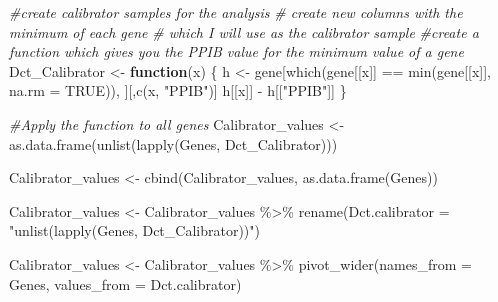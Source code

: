 \documentclass[
]{article}
\newenvironment{Shaded}{\begin{snugshade}}{\end{snugshade}}
\newcommand{\AttributeTok}[1]{\textcolor[rgb]{0.77,0.63,0.00}{#1}}
\newcommand{\CommentTok}[1]{\textcolor[rgb]{0.56,0.35,0.01}{\textit{#1}}}
\newcommand{\ConstantTok}[1]{\textcolor[rgb]{0.00,0.00,0.00}{#1}}
\newcommand{\ControlFlowTok}[1]{\textcolor[rgb]{0.13,0.29,0.53}{\textbf{#1}}}
\newcommand{\FunctionTok}[1]{\textcolor[rgb]{0.00,0.00,0.00}{#1}}
\newcommand{\NormalTok}[1]{#1}
\newcommand{\OtherTok}[1]{\textcolor[rgb]{0.56,0.35,0.01}{#1}}
\newcommand{\SpecialCharTok}[1]{\textcolor[rgb]{0.00,0.00,0.00}{#1}}
\newcommand{\StringTok}[1]{\textcolor[rgb]{0.31,0.60,0.02}{#1}}
\begin{document}
\begin{Shaded}
\begin{Highlighting}[]
\CommentTok{\#create calibrator samples for the analysis}
\CommentTok{\# create new columns with the minimum of each gene}
\CommentTok{\# which I will use as the calibrator sample}
\CommentTok{\#create a function which gives you the PPIB value for the minimum value of a gene}
\NormalTok{Dct\_Calibrator }\OtherTok{\textless{}{-}} \ControlFlowTok{function}\NormalTok{(x) \{}
\NormalTok{ h }\OtherTok{\textless{}{-}}\NormalTok{  gene[}\FunctionTok{which}\NormalTok{(gene[[x]] }\SpecialCharTok{==} \FunctionTok{min}\NormalTok{(gene[[x]], }\AttributeTok{na.rm =} \ConstantTok{TRUE}\NormalTok{)), ][,}\FunctionTok{c}\NormalTok{(x, }\StringTok{"PPIB"}\NormalTok{)]}
\NormalTok{ h[[x]] }\SpecialCharTok{{-}}\NormalTok{ h[[}\StringTok{"PPIB"}\NormalTok{]]}
\NormalTok{\}}


\CommentTok{\#Apply the function to all genes}
\NormalTok{Calibrator\_values }\OtherTok{\textless{}{-}} \FunctionTok{as.data.frame}\NormalTok{(}\FunctionTok{unlist}\NormalTok{(}\FunctionTok{lapply}\NormalTok{(Genes, Dct\_Calibrator)))}

\NormalTok{Calibrator\_values }\OtherTok{\textless{}{-}} \FunctionTok{cbind}\NormalTok{(Calibrator\_values, }\FunctionTok{as.data.frame}\NormalTok{(Genes))}


\NormalTok{Calibrator\_values }\OtherTok{\textless{}{-}}\NormalTok{ Calibrator\_values }\SpecialCharTok{\%\textgreater{}\%}
  \FunctionTok{rename}\NormalTok{(}\AttributeTok{Dct.calibrator =} \StringTok{"unlist(lapply(Genes, Dct\_Calibrator))"}\NormalTok{)}

\NormalTok{Calibrator\_values }\OtherTok{\textless{}{-}}\NormalTok{ Calibrator\_values }\SpecialCharTok{\%\textgreater{}\%} \FunctionTok{pivot\_wider}\NormalTok{(}\AttributeTok{names\_from =}\NormalTok{ Genes, }\AttributeTok{values\_from =}\NormalTok{ Dct.calibrator)}




\end{Highlighting}
\end{Shaded}
\end{document}
